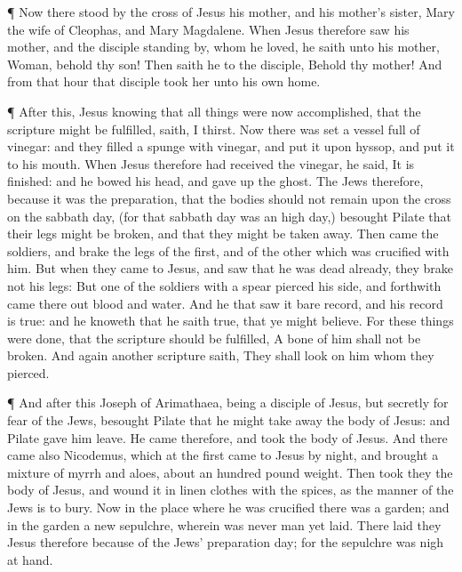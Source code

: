  ¶ Now there stood by the cross of Jesus his mother, and
his mother's sister, Mary the wife of Cleophas, and Mary Magdalene.
 When Jesus therefore saw his mother, and the disciple
standing by, whom he loved, he saith unto his mother, Woman, behold thy
son!  Then saith he to the disciple, Behold thy mother! And
from that hour that disciple took her unto his own home.

 ¶ After this, Jesus knowing that all things were now
accomplished, that the scripture might be fulfilled, saith, I thirst.
 Now there was set a vessel full of vinegar: and they
filled a spunge with vinegar, and put it upon hyssop, and put it to his
mouth.  When Jesus therefore had received the vinegar, he
said, It is finished: and he bowed his head, and gave up the ghost.
 The Jews therefore, because it was the preparation, that
the bodies should not remain upon the cross on the sabbath day, (for
that sabbath day was an high day,) besought Pilate that their legs might
be broken, and that they might be taken away.  Then came
the soldiers, and brake the legs of the first, and of the other which
was crucified with him.  But when they came to Jesus, and
saw that he was dead already, they brake not his legs:  But
one of the soldiers with a spear pierced his side, and forthwith came
there out blood and water.  And he that saw it bare record,
and his record is true: and he knoweth that he saith true, that ye might
believe.  For these things were done, that the scripture
should be fulfilled, A bone of him shall not be broken. 
And again another scripture saith, They shall look on him whom they
pierced.

 ¶ And after this Joseph of Arimathaea, being a disciple of
Jesus, but secretly for fear of the Jews, besought Pilate that he might
take away the body of Jesus: and Pilate gave him leave. He came
therefore, and took the body of Jesus.  And there came also
Nicodemus, which at the first came to Jesus by night, and brought a
mixture of myrrh and aloes, about an hundred pound weight. 
Then took they the body of Jesus, and wound it in linen clothes with the
spices, as the manner of the Jews is to bury.  Now in the
place where he was crucified there was a garden; and in the garden a new
sepulchre, wherein was never man yet laid.  There laid they
Jesus therefore because of the Jews' preparation day; for the sepulchre
was nigh at hand.

